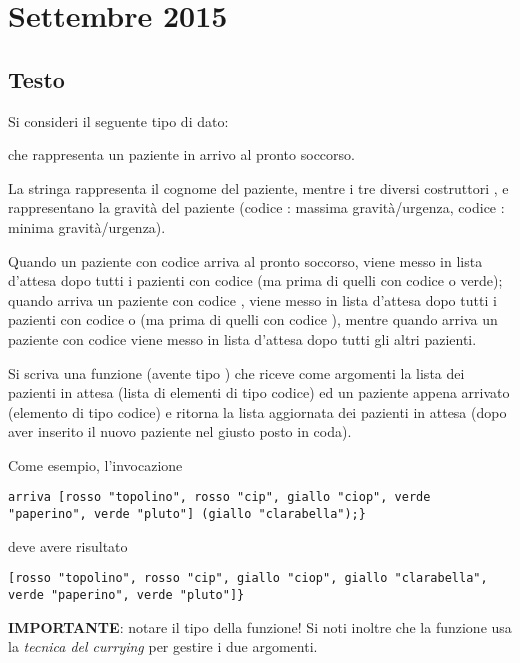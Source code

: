 \section{Settembre 2015}

\subsection{Testo}

Si consideri il seguente tipo di dato:

che rappresenta un paziente in arrivo al pronto soccorso.

\medskip
La stringa rappresenta il cognome del paziente, mentre i tre diversi costruttori ,  e  rappresentano la gravità del paziente (codice : massima gravità/urgenza, codice : minima gravità/urgenza).

\medskip
Quando un paziente con codice  arriva al pronto soccorso, viene messo in lista d'attesa dopo tutti i pazienti con codice  (ma prima di quelli con codice  o verde); quando arriva un paziente con codice , viene messo in lista d'attesa dopo tutti i pazienti con codice  o  (ma prima di quelli con codice ), mentre quando arriva un paziente con codice  viene messo in lista d'attesa dopo tutti gli altri pazienti.

\medskip
Si scriva una funzione  (avente tipo ) che riceve come argomenti la lista dei pazienti in attesa (lista di elementi di tipo codice) ed un paziente appena arrivato (elemento di tipo codice) e ritorna la lista aggiornata dei pazienti in attesa (dopo aver inserito il nuovo paziente nel giusto posto in coda).

\medskip
Come esempio, l'invocazione
\begin{lstlisting}
arriva [rosso "topolino", rosso "cip", giallo "ciop", verde "paperino", verde "pluto"] (giallo "clarabella");}
\end{lstlisting}
deve avere risultato
\begin{lstlisting}
[rosso "topolino", rosso "cip", giallo "ciop", giallo "clarabella", verde "paperino", verde "pluto"]}
\end{lstlisting}

\medskip
\textbf{IMPORTANTE}: notare il tipo della funzione! Si noti inoltre che la funzione usa la \emph{tecnica del currying} per gestire i due argomenti.

